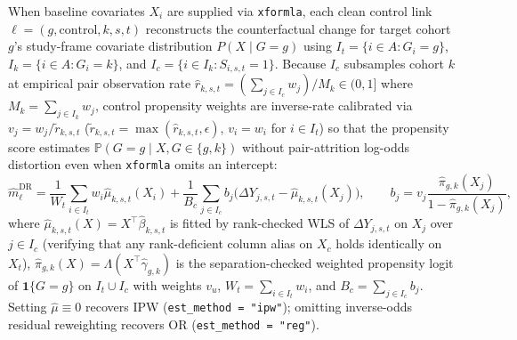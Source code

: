 \documentclass[11pt]{article}
\theoremstyle{definition}
\theoremstyle{remark}
\begin{document}
When baseline covariates $X_i$ are supplied via \texttt{xformla}, each clean control link $\ell = (g, \mathrm{control}, k, s, t)$ reconstructs the counterfactual change for target cohort $g$'s study-frame covariate distribution $P(X \mid G = g)$ using $I_t = \{i \in A : G_i = g\}$, $I_k = \{i \in A : G_i = k\}$, and $I_c = \{i \in I_k : S_{i,s,t} = 1\}$. Because $I_c$ subsamples cohort $k$ at empirical pair observation rate $\hat{r}_{k,s,t} = (\sum_{j \in I_c} w_j)/M_k \in (0,1]$ where $M_k = \sum_{j \in I_k} w_j$, control propensity weights are inverse-rate calibrated via $v_j = w_j / \tilde{r}_{k,s,t}$ ($\tilde{r}_{k,s,t} = \max(\hat{r}_{k,s,t}, \epsilon)$, $v_i = w_i$ for $i \in I_t$) so that the propensity score estimates $\mathbb{P}(G = g \mid X, G \in \{g,k\})$ without pair-attrition log-odds distortion even when \texttt{xformla} omits an intercept:
\[
\hat{m}_\ell^{\mathrm{DR}} = \frac{1}{W_t}\sum_{i \in I_t} w_i \hat{\mu}_{k,s,t}(X_i) + \frac{1}{B_c}\sum_{j \in I_c} b_j\bigl(\Delta Y_{j,s,t} - \hat{\mu}_{k,s,t}(X_j)\bigr), \qquad b_j = v_j \frac{\hat{\pi}_{g,k}(X_j)}{1 - \hat{\pi}_{g,k}(X_j)},
\]
where $\hat{\mu}_{k,s,t}(X) = X^\top \hat{\beta}_{k,s,t}$ is fitted by rank-checked WLS of $\Delta Y_{j,s,t}$ on $X_j$ over $j \in I_c$ (verifying that any rank-deficient column alias on $X_c$ holds identically on $X_t$), $\hat{\pi}_{g,k}(X) = \Lambda(X^\top \hat{\gamma}_{g,k})$ is the separation-checked weighted propensity logit of $\mathbf{1}\{G = g\}$ on $I_t \cup I_c$ with weights $v_u$, $W_t = \sum_{i \in I_t} w_i$, and $B_c = \sum_{j \in I_c} b_j$. Setting $\hat{\mu} \equiv 0$ recovers IPW (\texttt{est\_method = "ipw"}); omitting inverse-odds residual reweighting recovers OR (\texttt{est\_method = "reg"}).
\end{document}
